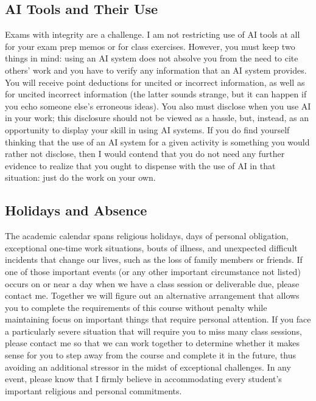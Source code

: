 \documentclass[11pt,]{article}
\begin{document}
\subsection{AI Tools and Their Use}\label{ai-tools-and-their-use}

Exams with integrity are a challenge. I am not restricting use of AI
tools at all for your exam prep memos or for class exercises. However,
you must keep two things in mind: using an AI system does not absolve
you from the need to cite others' work and you have to verify any
information that an AI system provides. You will receive point
deductions for uncited or incorrect information, as well as for uncited
incorrect information (the latter sounds strange, but it can happen if
you echo someone else's erroneous ideas). You also must disclose when
you use AI in your work; this disclosure should not be viewed as a
hassle, but, instead, as an opportunity to display your skill in using
AI systems. If you do find yourself thinking that the use of an AI
system for a given activity is something you would rather not disclose,
then I would contend that you do not need any further evidence to
realize that you ought to dispense with the use of AI in that situation:
just do the work on your own.

\subsection{Holidays and Absence}\label{holidays-and-absence}

The academic calendar spans religious holidays, days of personal
obligation, exceptional one-time work situations, bouts of illness, and
unexpected difficult incidents that change our lives, such as the loss
of family members or friends. If one of those important events (or any
other important circumstance not listed) occurs on or near a day when we
have a class session or deliverable due, please contact me. Together we
will figure out an alternative arrangement that allows you to complete
the requirements of this course without penalty while maintaining focus
on important things that require personal attention. If you face a
particularly severe situation that will require you to miss many class
sessions, please contact me so that we can work together to determine
whether it makes sense for you to step away from the course and complete
it in the future, thus avoiding an additional stressor in the midst of
exceptional challenges. In any event, please know that I firmly believe
in accommodating every student's important religious and personal
commitments.
\end{document}
